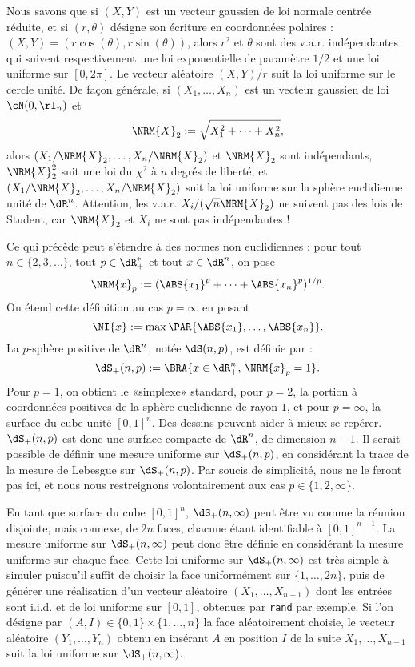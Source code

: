 Nous savons que si $(X,Y)$ est un vecteur gaussien de loi normale centrée
réduite, et si $(r,\theta)$ désigne son écriture en coordonnées polaires :
$(X,Y)=(r\cos(\theta),r\sin(\theta))$, alors $r^2$ et $\theta$ sont des v.a.r. indépendantes
qui suivent respectivement une loi exponentielle de paramètre $1/2$ et une loi
uniforme sur $[0,2\pi]$. Le vecteur aléatoire $(X,Y)/r$ suit la loi uniforme sur
le cercle unité. De façon générale, si $(X_1,\ldots,X_n)$ est un vecteur gaussien
de loi $\cN(0,\rI_n)$ et
$$
\NRM{X}_2:=\sqrt{X_1^2+\cdots+X_n^2},
$$
alors $(X_1/\NRM{X}_2,\ldots,X_n/\NRM{X}_2)$ et $\NRM{X}_2$ sont
indépendants, $\NRM{X}_2^2$ suit une loi du $\chi^2$ à $n$ degrés de liberté,
et $(X_1/\NRM{X}_2,\ldots,X_n/\NRM{X}_2)$ suit la loi uniforme sur la sphère
euclidienne unité de $\dR^n$. Attention, les v.a.r. $X_i/(\sqrt{n}\NRM{X}_2)$
ne suivent pas des lois de Student, car $\NRM{X}_2$ et $X_i$ ne sont pas
indépendantes !

Ce qui précède peut s'étendre à des normes non euclidiennes : pour tout
$n\in\{2,3,\ldots\}$, tout $p\in\dR_+^*$ et tout $x\in\dR^n$, on pose
$$
\NRM{x}_p:=(\ABS{x_1}^p+\cdots+\ABS{x_n}^p)^{1/p}.
$$ 
On étend cette définition au cas $p=\infty$ en posant
$$
\NI{x}:=\max\PAR{\ABS{x_1},\ldots,\ABS{x_n}}.
$$
La $p$-sphère positive de $\dR^n$, notée $\dS(n,p)$, est définie par :
$$
\dS_+(n,p):=\BRA{x\in\dR_+^n,\,\NRM{x}_p=1}.
$$
Pour $p=1$, on obtient le «simplexe» standard, pour $p=2$, la portion à
coordonnées positives de la sphère euclidienne de rayon $1$, et pour
$p=\infty$, la surface du cube unité $[0,1]^n$.  Des dessins peuvent aider à
mieux se repérer. $\dS_+(n,p)$ est donc une surface compacte de $\dR^n$, de
dimension $n-1$.  Il serait possible de définir une mesure uniforme sur
$\dS_+(n,p)$, en considérant la trace de la mesure de Lebesgue sur
$\dS_+(n,p)$. Par soucis de simplicité, nous ne le feront pas ici, et nous
nous restreignons volontairement aux cas $p\in\{1,2,\infty\}$.

En tant que surface du cube $[0,1]^n$, $\dS_+(n,\infty)$ peut être vu comme la
réunion disjointe, mais connexe, de $2n$ faces, chacune étant identifiable à
$[0,1]^{n-1}$. La mesure uniforme sur $\dS_+(n,\infty)$ peut donc être définie
en considérant la mesure uniforme sur chaque face. Cette loi uniforme sur
$\dS_+(n,\infty)$ est très simple à simuler puisqu'il suffit de choisir la
face uniformément sur $\{1,\ldots,2n\}$, puis de générer une réalisation d'un
vecteur aléatoire $(X_1,\ldots,X_{n-1})$ dont les entrées sont i.i.d. et de
loi uniforme sur $[0,1]$, obtenues par \texttt{rand} par exemple.  Si l'on
désigne par $(A,I)\in\{0,1\}\times\{1,\ldots,n\}$ la face aléatoirement
choisie, le vecteur aléatoire $(Y_1,\ldots,Y_n)$ obtenu en insérant $A$ en
position $I$ de la suite $X_1,\ldots,X_{n-1}$ suit la loi uniforme sur
$\dS_+(n,\infty)$.

